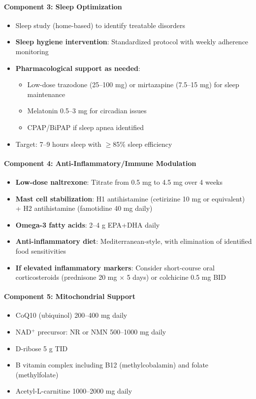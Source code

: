 \paragraph{Component 3: Sleep Optimization}
\begin{itemize}
    \item Sleep study (home-based) to identify treatable disorders
    \item \textbf{Sleep hygiene intervention}: Standardized protocol with weekly adherence monitoring
    \item \textbf{Pharmacological support as needed}:
    \begin{itemize}
        \item Low-dose trazodone (25--100 mg) or mirtazapine (7.5--15 mg) for sleep maintenance
        \item Melatonin 0.5--3 mg for circadian issues
        \item CPAP/BiPAP if sleep apnea identified
    \end{itemize}
    \item Target: 7--9 hours sleep with $\geq$85\% sleep efficiency
\end{itemize}

\paragraph{Component 4: Anti-Inflammatory/Immune Modulation}
\begin{itemize}
    \item \textbf{Low-dose naltrexone}: Titrate from 0.5 mg to 4.5 mg over 4 weeks
    \item \textbf{Mast cell stabilization}: H1 antihistamine (cetirizine 10 mg or equivalent) + H2 antihistamine (famotidine 40 mg daily)
    \item \textbf{Omega-3 fatty acids}: 2--4 g EPA+DHA daily
    \item \textbf{Anti-inflammatory diet}: Mediterranean-style, with elimination of identified food sensitivities
    \item \textbf{If elevated inflammatory markers}: Consider short-course oral corticosteroids (prednisone 20 mg $\times$ 5 days) or colchicine 0.5 mg BID
\end{itemize}

\paragraph{Component 5: Mitochondrial Support}
\begin{itemize}
    \item CoQ10 (ubiquinol) 200--400 mg daily
    \item NAD$^+$ precursor: NR or NMN 500--1000 mg daily
    \item D-ribose 5 g TID
    \item B vitamin complex including B12 (methylcobalamin) and folate (methylfolate)
    \item Acetyl-L-carnitine 1000--2000 mg daily
\end{itemize}

